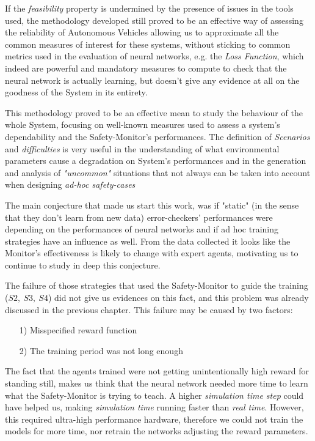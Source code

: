 If the \textsl{feasibility} property is undermined by the presence of issues in the tools used, the methodology developed still proved to be an effective way of assessing the reliability of Autonomous Vehicles allowing us to approximate all the common measures of interest for these systems, without sticking to common metrics used in the evaluation of neural networks, e.g. the \textsl{Loss Function}, which indeed are powerful and mandatory measures to compute to check that the neural network is actually learning, but doesn't give any evidence at all on the goodness of the System in its entirety.

This methodology proved to be an effective mean to study the behaviour of the whole System, focusing on well-known measures used to assess a system's dependability and the Safety-Monitor's performances. The definition of \textsl{Scenarios} and \textsl{difficulties} is very useful in the understanding of what environmental parameters cause a degradation on System's performances and in the generation and analysis of \textsl{"uncommon"} situations that not always can be taken into account when designing \textsl{ad-hoc safety-cases}
\newline

The main conjecture that made us start this work, was if "static" (in the sense that they don't learn from new data) error-checkers' performances were depending on the performances of neural networks and if ad hoc training strategies have an influence as well. From the data collected it looks like the Monitor's effectiveness is likely to change with expert agents, motivating us to continue to study in deep this conjecture.

The failure of those strategies that used the Safety-Monitor to guide the training ($S2,\: S3,\: S4$) did not give us evidences on this fact, and this problem was already discussed in the previous chapter. This failure may be caused by two factors:

\begin{itemize}
	\item[1)] Misspecified reward function
	\item[2)] The training period was not long enough
\end{itemize}

The fact that the agents trained were not getting unintentionally high reward for standing still, makes us think that the neural network needed more time to learn what the Safety-Monitor is trying to teach. A higher \textsl{simulation time step} could have helped us, making \textsl{simulation time} running faster than \textsl{real time}. However, this required ultra-high performance hardware, therefore we could not train the models for more time, nor retrain the networks adjusting the reward parameters.


